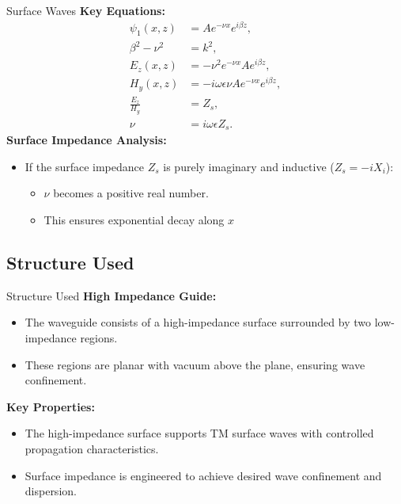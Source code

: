 \documentclass{beamer}
\begin{document}
\begin{frame}{Surface Waves}
    \textbf{Key Equations\cite{sarabandi}:}
\begin{align}
    \psi_1(x, z) &= A e^{-\nu x} e^{i\beta z}, \\
    \beta^2 - \nu^2 &= k^2, \\
    E_z(x, z) &= -\nu^2 e^{-\nu x} A e^{i\beta z}, \\
    H_y(x, z) &= -i \omega \epsilon \nu A e^{-\nu x} e^{i\beta z}, \\
    \frac{E_z}{H_y} &= Z_s, \\
    \nu &= i \omega \epsilon Z_s.
\end{align}
\textbf{Surface Impedance Analysis:}
\begin{itemize}
    \item If the surface impedance \( Z_s \) is purely imaginary and inductive (\( Z_s = -iX_i \)):
    \begin{itemize}
        \item \( \nu \) becomes a positive real number.
        \item This ensures exponential decay along \( x \)
    \end{itemize}
\end{itemize}
\end{frame}

\subsection{Structure Used}
\begin{frame}{Structure Used}
    \textbf{High Impedance Guide:}
    \begin{itemize}
        \item The waveguide consists of a high-impedance surface surrounded by two low-impedance regions.
        \item These regions are planar with vacuum above the plane, ensuring wave confinement.
    \end{itemize}
    \textbf{Key Properties:}
    \begin{itemize}
        \item The high-impedance surface supports TM surface waves with controlled propagation characteristics.
        \item Surface impedance is engineered to achieve desired wave confinement and dispersion.
    \end{itemize}
\end{frame}
\end{document}
